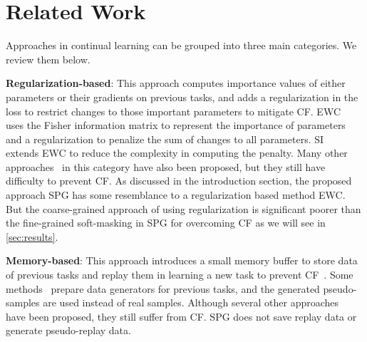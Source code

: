 \section{Related Work} \label{sec:related_work}
Approaches in continual learning can be grouped into three main categories. We review them below.


\textbf{Regularization-based}:
This approach computes importance values of either parameters or their gradients on previous tasks, and adds a regularization in the loss to restrict changes to those important parameters to mitigate CF. 
EWC~\citep{ewc} uses the Fisher information matrix to represent the importance of parameters and a regularization to penalize the sum of changes to all parameters. 
SI~\citep{si} extends EWC to reduce the complexity in computing the penalty.
Many other approaches~\citep{lwf,dmc,ucl} in this category have also been proposed, but they still have difficulty to prevent CF.  
As discussed in the introduction section, the proposed approach SPG has some resemblance to a  regularization based method EWC. But the coarse-grained approach of using regularization is significant poorer than the fine-grained soft-masking in SPG for overcoming CF as we will see in \cref{sec:results}.



\textbf{Memory-based}: 
This approach introduces a small memory buffer to store data of previous tasks and replay them in learning a new task to prevent CF~\citep{gem,a-gem}. Some methods~\citep{gr,binplay} prepare data generators for previous tasks, and the generated pseudo-samples are used instead of real samples. 
Although several other approaches~\citep{icarl,mer,mir} have been proposed, they still suffer from CF. SPG does not save replay data or generate pseudo-replay data.



